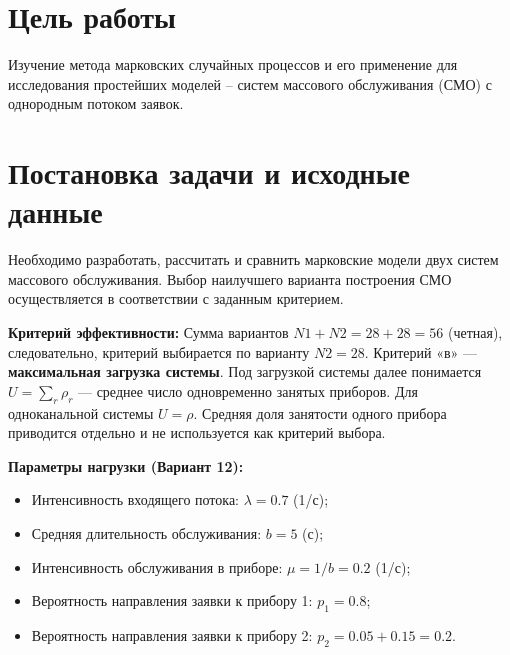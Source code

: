 \documentclass[a4paper,12pt]{article}
\begin{document}
    

    \begin{centering}
        \renewcommand{\contentsname}{Содержание}
        \tableofcontents
    \end{centering}
    \newpage

    \section{Цель работы}
    Изучение метода марковских случайных процессов и его применение для исследования простейших моделей – систем массового обслуживания (СМО) с однородным потоком заявок.

    \section{Постановка задачи и исходные данные}
    Необходимо разработать, рассчитать и сравнить марковские модели двух систем массового обслуживания. Выбор наилучшего варианта построения СМО осуществляется в соответствии с заданным критерием.

    \textbf{Критерий эффективности:} Сумма вариантов $N1+N2 = 28+28=56$ (четная), следовательно, критерий выбирается по варианту $N2=28$. Критерий «в» — \textbf{максимальная загрузка системы}.
    Под загрузкой системы далее понимается $U=\sum_r \rho_r$ --- среднее число одновременно занятых приборов. Для одноканальной системы $U=\rho$. Средняя доля занятости одного прибора приводится отдельно и не используется как критерий выбора.

    \textbf{Параметры нагрузки (Вариант 12):}
    \begin{itemize}
        \item Интенсивность входящего потока: $\lambda = 0.7$ (1/с);
        \item Средняя длительность обслуживания: $b = 5$ (с);
        \item Интенсивность обслуживания в приборе: $\mu = 1/b = 0.2$ (1/с);
        \item Вероятность направления заявки к прибору 1: $p_1 = 0.8$;
        \item Вероятность направления заявки к прибору 2: $p_2 = 0.05 + 0.15 = 0.2$.
    \end{itemize}
\end{document}
